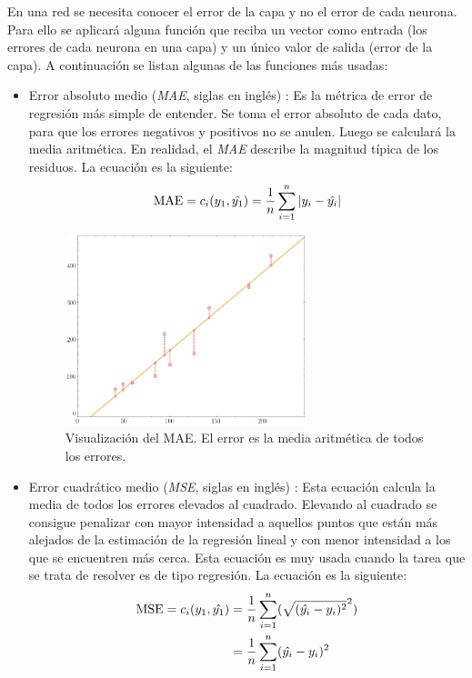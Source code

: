 En una red se necesita conocer el error de la capa y no el error de cada neurona. Para ello se aplicará alguna función que reciba un vector como entrada (los errores de cada neurona en una capa) y un único valor de salida (error de la capa). A continuación se listan algunas de las funciones más usadas\cite{tensorflow2015-whitepaper}:


\begin{itemize}
\item Error absoluto medio (\textit{MAE}, siglas en inglés) \cite{errors_basics} \label{MAE_loss}: Es la métrica de error de regresión más simple de entender. Se toma el error absoluto de cada dato, para que los errores negativos y positivos no se anulen. Luego se calculará la media aritmética. En realidad, el \textit{MAE} describe la magnitud típica de los residuos. La ecuación es la siguiente:
\begin{equation}
\centering
    \begin{split}
        \text{MAE} = c_i(y_1, \hat{y_1}) = \frac{1}{n} \sum_{i=1}^n |y_i - \hat{y_i}|
    \end{split}
\end{equation}

\begin{figure}[H]
    \centering
    \includegraphics[width=7cm]{images/state-of-art/cost-function/mae.png}
    \caption{Visualización del MAE. El error es la media aritmética de todos los errores.}
    \label{fig:error_mae}
\end{figure}

\item Error cuadrático medio (\textit{MSE}, siglas en inglés) \cite{errors_basics}\label{MSE_loss}: Esta ecuación calcula la media de todos los errores elevados al cuadrado. Elevando al cuadrado se consigue penalizar con mayor intensidad a aquellos puntos que están más alejados de la estimación de la regresión lineal y con menor intensidad a los que se encuentren más cerca. Esta ecuación es muy usada cuando la tarea que se trata de resolver es de tipo regresión. La ecuación es la siguiente:
\begin{equation}
\centering
    \begin{split}
        \text{MSE} = c_i(y_1, \hat{y_1}) &= \frac{1}{n} \sum_{i=1}^n (\sqrt{(\hat{y_i} - y_i)^2}^2) \\
        & = \frac{1}{n} \sum_{i=1}^n (\hat{y_i} - y_i)^2
    \end{split}
\end{equation}


\end{itemize}
